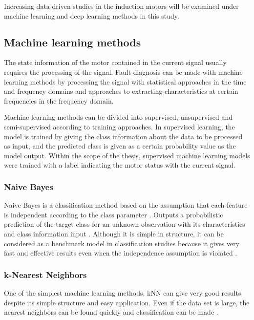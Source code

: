 Increasing data-driven studies in the induction motors will be examined under machine learning and deep learning methods in this study. 

\subsection{Machine learning methods}

The state information of the motor contained in the current signal usually requires the processing of the signal. Fault diagnosis can be made with machine learning methods by processing the signal with statistical approaches in the time and frequency domains and approaches to extracting characteristics at certain frequencies in the frequency domain. 

Machine learning methods can be divided into supervised, unsupervised and semi-supervised according to training approaches. In supervised learning, the model is trained by giving the class information about the data to be processed as input, and the predicted class is given as a certain probability value as the model output. Within the scope of the thesis, supervised machine learning models were trained with a label indicating the motor status with the current signal.

\subsubsection{Naive Bayes}

Naive Bayes is a classification method based on the assumption that each feature is independent according to the class parameter \cite{friedman1997bayesian}. Outputs a probabilistic prediction of the target class for an unknown observation with its characteristics and class information input \cite{lowd2005naive}. Although it is simple in structure, it can be considered as a benchmark model in classification studies because it gives very fast and effective results even when the independence assumption is violated \cite{martin2018experimental}. 

\subsubsection{k-Nearest Neighbors}

One of the simplest machine learning methods, kNN can give very good results despite its simple structure and easy application. Even if the data set is large, the nearest neighbors can be found quickly and classification can be made \cite{shalev2014understanding}.

